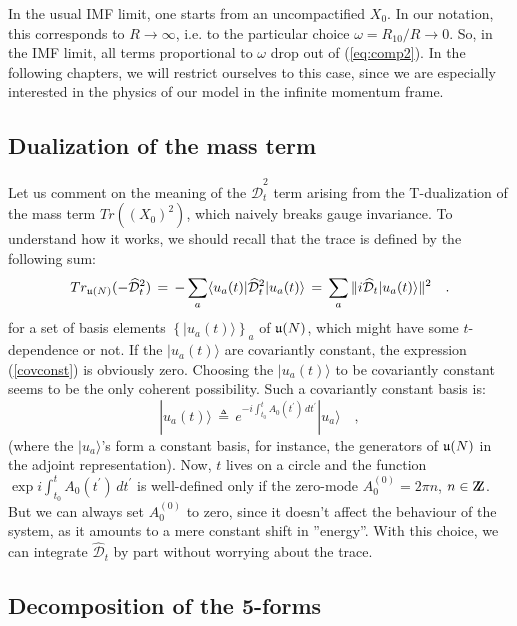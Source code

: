 \documentclass[a4paper,11pt]{article}
\def\Z{{\rm Z\kern-.34em Z}}
\begin{document}
In the usual IMF limit, one starts from an uncompactified $X_0$. In our notation, this corresponds to 
$R \rightarrow \infty$, i.e. to the particular choice $\omega=R_{10}/R \rightarrow 0$. So, in the IMF limit,
all terms proportional to $\omega$ drop out of (\ref{eq:comp2}). In the following chapters, we will restrict
ourselves to this case, since we are especially interested in the physics of our model in the infinite
momentum frame.

\subsection{Dualization of the mass term}

Let us comment on the meaning of the $\mathcal{\widehat{D}}_t^{2}$ term arising from the T-dualization of 
the mass term $Tr((X_0)^2)$, which naively breaks gauge invariance. To understand how it works, we should 
recall that the trace is defined by the following sum:
\begin{equation}\label{covconst}
Tr_{\frak{u}(N)}(-\mathcal{\widehat{D}}_t^{2})\,=\,-\sum_{a}\langle
u_{a}(t)|\mathcal{\widehat{D}}_{t}^{2}|u_{a}(t)\rangle \,=\,\sum_{a}\Vert
i\mathcal{\widehat{D}}_{t}|u_{a}(t)\rangle \Vert ^{2}\quad .  
\end{equation}
for a set of basis elements $\left\{|u_{a}(t)\rangle \right\}_{a}$ of $\frak{u}(N)$, 
which might have some $t$-dependence or not. If the $|u_{a}(t)\rangle$ are covariantly constant, 
the expression (\ref{covconst}) is obviously zero. Choosing the $|u_{a}(t)\rangle $ to be covariantly
constant seems to be the only coherent possibility. Such a covariantly constant basis is:
\[
|u_{a}(t)\rangle \,\triangleq \,e^{-i\int_{t_{0}}^{t}A_{0}(t^{\prime
})\,dt^{\prime }}|u_{a}\rangle \quad ,
\]
(where the $|u_{a}\rangle $'s form a constant basis, for instance, the generators of 
$\frak{u}(N)$ in the adjoint representation). Now, $t$ lives on a circle  and the function 
$\exp i\int_{t_{0}}^{t}A_{0} (t^{\prime})\,dt^{\prime}$ is well-defined only if the zero-mode 
$A_{0}^{(0)}=2\pi n$, $n\in \Z$. But we can always set $A_{0}^{(0)}$ to zero, since it doesn't 
affect the behaviour of the system, as it amounts to a mere constant shift in ''energy''. 
With this choice, we can integrate $\mathcal{\widehat{D}}_t$ by part without worrying about the trace.

\subsection{Decomposition of the 5-forms}
\end{document}

